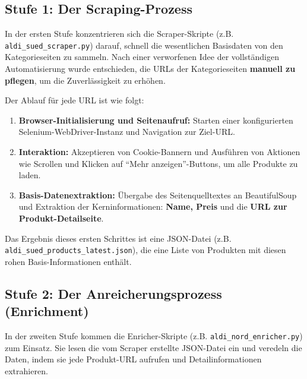 \documentclass[12pt, a4paper]{report} %
\begin{document}
\subsection{Stufe 1: Der Scraping-Prozess}
In der ersten Stufe konzentrieren sich die Scraper-Skripte (z.B. \texttt{aldi\_sued\_scraper.py}) darauf, schnell die wesentlichen Basisdaten von den Kategorieseiten zu sammeln. Nach einer verworfenen Idee der vollständigen Automatisierung wurde entschieden, die URLs der Kategorieseiten \textbf{manuell zu pflegen}, um die Zuverlässigkeit zu erhöhen.

Der Ablauf für jede URL ist wie folgt:
\begin{enumerate}
    \item \textbf{Browser-Initialisierung und Seitenaufruf:} Starten einer konfigurierten Selenium-WebDriver-Instanz und Navigation zur Ziel-URL.
    \item \textbf{Interaktion:} Akzeptieren von Cookie-Bannern und Ausführen von Aktionen wie Scrollen und Klicken auf "`Mehr anzeigen"'-Buttons, um alle Produkte zu laden.
    \item \textbf{Basis-Datenextraktion:} Übergabe des Seitenquelltextes an BeautifulSoup und Extraktion der Kerninformationen: \textbf{Name, Preis} und die \textbf{URL zur Produkt-Detailseite}.
\end{enumerate}
Das Ergebnis dieses ersten Schrittes ist eine JSON-Datei (z.B. \texttt{aldi\_sued\_products\_latest.json}), die eine Liste von Produkten mit diesen rohen Basis-Informationen enthält.

\subsection{Stufe 2: Der Anreicherungsprozess (Enrichment)}
In der zweiten Stufe kommen die Enricher-Skripte (z.B. \texttt{aldi\_nord\_enricher.py}) zum Einsatz. Sie lesen die vom Scraper erstellte JSON-Datei ein und veredeln die Daten, indem sie jede Produkt-URL aufrufen und Detailinformationen extrahieren.
\end{document}
